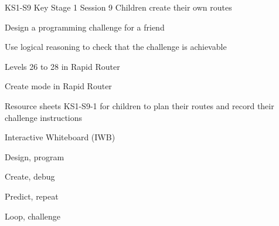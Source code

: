 \documentclass{../../../lessonplan}
\begin{document}
\lessonplantitle
    {KS1-S9}
    {Key Stage 1 Session 9}
    {Children create their own routes}

\preamble
    {
    \item Design a programming challenge for a friend
    \item Use logical reasoning to check that the challenge is achievable
    }
    {
    \item Levels 26 to 28 in Rapid Router  
    \item Create mode in Rapid Router
    \item Resource sheets KS1-S9-1 for children to plan their routes and record their challenge instructions
   \item Interactive Whiteboard (IWB)
    }
    {
    \item Design, program
    \item Create, debug
    \item Predict, repeat
    \item Loop, challenge
    }
\end{document}
